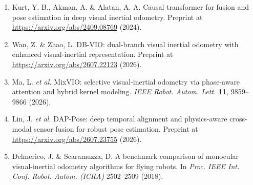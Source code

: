 \documentclass[10pt,a4paper]{article}
\newcommand{\tbf}[1]{\textbf{#1}}
\begin{document}
\begin{enumerate}
\item Kurt, Y. B., Akman, A. \& Alatan, A. A. Causal transformer for fusion and pose estimation in deep visual inertial odometry. Preprint at \url{https://arxiv.org/abs/2409.08769} (2024).
\item Wan, Z. \& Zhao, L. DB-VIO: dual-branch visual inertial odometry with enhanced visual-inertial representation. Preprint at \url{https://arxiv.org/abs/2607.22123} (2026).
\item Ma, L. \emph{et al.} MixVIO: selective visual-inertial odometry via phase-aware attention and hybrid kernel modeling. \emph{IEEE Robot. Autom. Lett.} \tbf{11}, 9859--9866 (2026).
\item Lin, J. \emph{et al.} DAP-Pose: deep temporal alignment and physics-aware cross-modal sensor fusion for robust pose estimation. Preprint at \url{https://arxiv.org/abs/2607.23755} (2026).
\item Delmerico, J. \& Scaramuzza, D. A benchmark comparison of monocular visual-inertial odometry algorithms for flying robots. In \emph{Proc. IEEE Int. Conf. Robot. Autom. (ICRA)} 2502--2509 (2018).
\end{enumerate}
\end{document}
